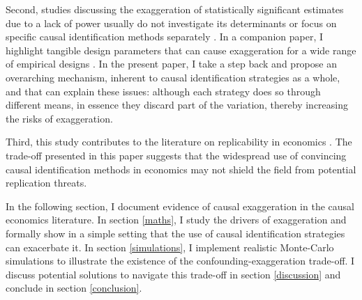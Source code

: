 			Second, studies discussing the exaggeration of statistically significant estimates due to a lack of power usually do not investigate its determinants or focus on specific causal identification methods separately \citep{ioannidis_power_2017, schellEvaluatingMethodsEstimate2018, ferraro_featureis_2020, blackSimulatedPowerAnalyses2022, stommes_reliability_2021, arel-bundockQuantitativePoliticalScience2022}.  In a companion paper, I highlight tangible design parameters that can cause exaggeration for a wide range of empirical designs \citep{bagilet_accurately_2023}. In the present paper, I take a step back and propose an overarching mechanism, inherent to causal identification strategies as a whole, and that can explain these issues: although each strategy does so through different means, in essence they discard part of the variation, thereby increasing the risks of exaggeration. %
			
			Third, this study contributes to the literature on replicability in economics \citep{camerer_evaluating_2016, ioannidis_power_2017, christensen_transparency_2018, kasy_forking_2021}. The trade-off presented in this paper suggests that the widespread use of convincing causal identification methods in economics may not shield the field from potential replication threats.
			
			In the following section, I document evidence of causal exaggeration in the causal  economics literature. In section \ref{maths}, I study the drivers of exaggeration and formally show in a simple setting that the use of causal identification strategies can exacerbate it. In section  \ref{simulations}, I implement realistic Monte-Carlo simulations to illustrate the existence of the confounding-exaggeration trade-off. I discuss potential solutions to navigate this trade-off in section \ref{discussion} and conclude in section \ref{conclusion}.
	
	
		